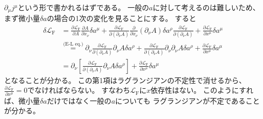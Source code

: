 \documentclass[a4paper, 10pt]{jsarticle}
\theoremstyle{definition}
\newcommand{\pdif}[2]{\frac{\partial #1}{\partial #2}}
\begin{document}
$\partial_\mu j^\mu$という形で書かれるはずである。
一般の$a$に対して考えるのは難しいため、
まず微小量$\delta a$の場合の1次の変化を見ることにする。
すると
\begin{align}
	\delta \mathcal{L}_\textrm{F}
	&= \pdif{\mathcal{L}_\textrm{F}}{A} \pdif{A}{x_\nu} \delta a^\mu
	+ \pdif{\mathcal{L}_\textrm{F}}{\left( \partial_\nu A \right)}
	\pdif{}{x_\nu} \left( \partial_\nu A \right) \delta a^\rho
	\pdif{\mathcal{L}_\textrm{F}}{\left( \partial_\nu A \right)}
	+ \pdif{\mathcal{L}_\textrm{F}}{x^\mu} \delta a^\mu \\
	&\stackrel{\textrm{(E-L eq.)}}{=} %
	\partial_\nu
	\pdif{\mathcal{L}_\textrm{F}}{\left( \partial_\nu A \right)}
	\partial_\nu A \delta a^\rho
	+ \pdif{\mathcal{L}_\textrm{F}}{\left( \partial_\nu A \right)}
	\partial_\nu \partial_\nu A \delta a^\rho
	+ \pdif{\mathcal{L}_\textrm{F}}{x^\mu} \delta a^\mu \\
	&= \partial_\nu \left[
		\pdif{\mathcal{L}_\textrm{F}}{\left( \partial_\nu A \right)}
		\partial_\nu A \delta a^\rho
	\right] + \pdif{\mathcal{L}_\textrm{F}}{x^\mu} \delta a^\mu
\end{align}
となることが分かる。
この第1項はラグランジアンの不定性で消せるから、
$\pdif{\mathcal{L}_\textrm{F}}{x^\mu} = 0$でなければならない。
すなわち$\mathcal{L}_\textrm{F}$に$x$依存性はない。
このようにすれば、微小量$\delta a$だけではなく一般の$a$についても
ラグランジアンが不定であることが分かる。
\end{document}
